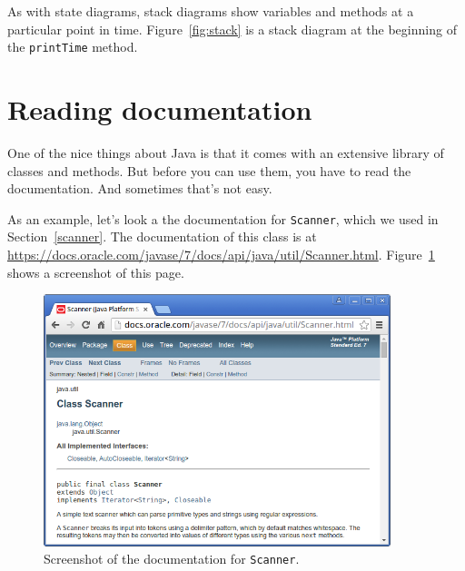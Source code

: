 \documentclass[12pt]{book}
\theoremstyle{exercise}
\newcommand{\java}[1]{\verb"#1"}
\begin{document}
As with state diagrams, stack diagrams show variables and methods at a particular point in time.
Figure~\ref{fig:stack} is a stack diagram at the beginning of the \java{printTime} method.





\section{Reading documentation}
\label{sec:apidocs}


One of the nice things about Java is that it comes with an extensive library of classes and methods.
But before you can use them, you have to read the documentation.
And sometimes that's not easy.


As an example, let's look a the documentation for \java{Scanner}, which we used in Section~\ref{scanner}.
The documentation of this class is at \url{https://docs.oracle.com/javase/7/docs/api/java/util/Scanner.html}.
Figure~\ref{fig:javadoc} shows a screenshot of this page.

\begin{figure}[!ht]
\begin{center}
\includegraphics[width=0.9\textwidth]{figs/scanner.png}
\caption{Screenshot of the documentation for \java{Scanner}.}
\label{fig:javadoc}
\end{center}
\end{figure}
\end{document}
